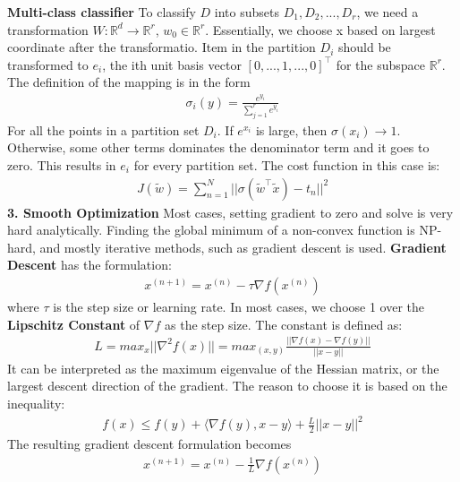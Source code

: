 \documentclass[11pt]{article}
\theoremstyle{plain}
\theoremstyle{definition}
\begin{document}
\textbf{Multi-class classifier}\newline 
To classify $D$ into subsets $D_1, D_2, ..., D_r$, we need a transformation $W : \mathbb{R}^d \longrightarrow \mathbb{R}^r$, $w_0 \in \mathbb{R}^r$. Essentially, we choose x based on largest coordinate after the transformatio. Item in the partition $D_i$ should be transformed to $e_i$, the ith unit basis vector $[0,...,1,..., 0]^\top$ for the subspace $\mathbb{R}^r$. The definition of the mapping is in the form \begin{align*}
\sigma_i (y) = \frac{e^{y_i}}{\sum\limits_{j=1}^{r} e^{y_i}}
\end{align*}
For all the points in a partition set $D_i$. If $e^{x_i}$ is large, then $\sigma(x_i) \longrightarrow 1$. Otherwise, some other terms dominates the denominator term and it goes to zero. This results in $e_i$ for every partition set. The cost function in this case is: \begin{align*}
J(\tilde{w}) = \sum\limits_{n=1}^{N} || \sigma(\tilde{w}^\top \tilde{x}) - t_n ||^2
\end{align*}
\vspace{10mm} \newline 
\textbf{3. Smooth Optimization}\newline
\vspace{5mm} 
Most cases, setting gradient to zero and solve is very hard analytically. Finding the global minimum of a non-convex function is NP-hard, and mostly iterative methods, such as gradient descent is used.\newline 
\textbf{Gradient Descent} has the formulation: \begin{align*}
x^{(n+1)} = x^{(n)} - \tau \nabla f(x^{(n)})
\end{align*}
where $\tau$ is the step size or learning rate. In most cases, we choose 1 over the \textbf{Lipschitz Constant} of $\nabla f$ as the step size. The constant is defined as: \begin{align*}
L = max_x ||\nabla^2 f(x) || = max_{(x,y)} \frac{||\nabla f(x) - \nabla f(y) ||}{||x-y||}
\end{align*}
It can be interpreted as the maximum eigenvalue of the Hessian matrix, or the largest descent direction of the gradient. The reason to choose it is based on the inequality: \begin{align*}
f(x) \leq f(y) + \langle \nabla f(y), x-y \rangle + \frac{L}{2} || x - y||^2
\end{align*}
The resulting gradient descent formulation becomes \begin{align*}
x^{(n+1)} = x^{(n)} - \frac{1}{L} \nabla f(x^{(n)})
\end{align*}
\end{document}
